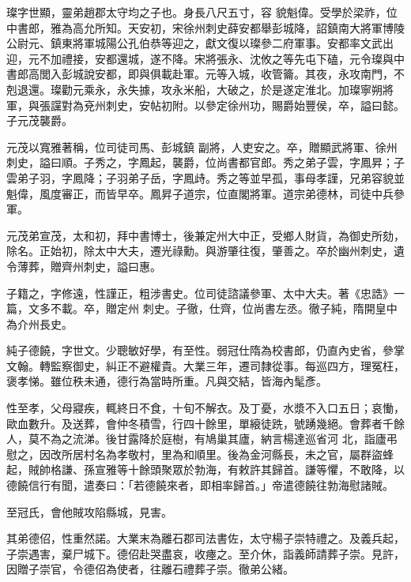 \begin{pinyinscope}
 璨字世顯，靈弟趙郡太守均之子也。身長八尺五寸，容
 貌魁偉。受學於梁祚，位中書郎，雅為高允所知。天安初，宋徐州刺史薛安都舉彭城降，詔鎮南大將軍博陵公尉元、鎮東將軍城陽公孔伯恭等迎之，獻文復以璨參二府軍事。安都率文武出迎，元不加禮接，安都還城，遂不降。宋將張永、沈攸之等先屯下磕，元令璨與中書郎高閭入彭城說安都，即與俱載赴軍。元等入城，收管籥。其夜，永攻南門，不剋退還。璨勸元乘永，永失據，攻永米船，大破之，於是遂定淮北。加璨寧朔將軍，與張讜對為兗州刺史，安帖初附。以參定徐州功，賜爵始豐侯，卒，謚曰懿。子元茂襲爵。



 元茂以寬雅著稱，位司徒司馬、彭城鎮
 副將，人吏安之。卒，贈顯武將軍、徐州刺史，謚曰順。子秀之，字鳳起，襲爵，位尚書都官郎。秀之弟子雲，字鳳昇；子雲弟子羽，字鳳降；子羽弟子岳，字鳳歭。秀之等並早孤，事母孝謹，兄弟容貌並魁偉，風度審正，而皆早卒。鳳昇子道宗，位直閣將軍。道宗弟德林，司徒中兵參軍。



 元茂弟宣茂，太和初，拜中書博士，後兼定州大中正，受鄉人財貨，為御史所劾，除名。正始初，除太中大夫，遷光祿勳。與游肇往復，肇善之。卒於幽州刺史，遺令薄葬，贈齊州刺史，謚曰惠。



 子籍之，字修遠，性謹正，粗涉書史。位司徒諮議參軍、太中大夫。著《忠誥》一篇，文多不載。卒，贈定州
 刺史。子徹，仕齊，位尚書左丞。徹子純，隋開皇中為介州長史。



 純子德饒，字世文。少聰敏好學，有至性。弱冠仕隋為校書郎，仍直內史省，參掌文翰。轉監察御史，糾正不避權貴。大業三年，遷司隸從事。每巡四方，理冤枉，褒孝悌。雖位秩未通，德行為當時所重。凡與交結，皆海內髦彥。



 性至孝，父母寢疾，輒終日不食，十旬不解衣。及丁憂，水漿不入口五日；哀慟，歐血數升。及送葬，會仲冬積雪，行四十餘里，單縗徒跣，號踴幾絕。會葬者千餘人，莫不為之流涕。後甘露降於庭樹，有鳩巢其廬，納言楊達巡省河
 北，詣廬弔慰之，因改所居村名為孝敬村，里為和順里。後為金河縣長，未之官，屬群盜蜂起，賊帥格謙、孫宣雅等十餘頭聚眾於勃海，有敕許其歸首。謙等懼，不敢降，以德饒信行有聞，遣奏曰：「若德饒來者，即相率歸首。」帝遣德饒往勃海慰諸賊。



 至冠氏，會他賊攻陷縣城，見害。



 其弟德佋，性重然諾。大業末為離石郡司法書佐，太守楊子崇特禮之。及義兵起，子崇遇害，棄尸城下。德佋赴哭盡哀，收瘞之。至介休，詣義師請葬子崇。見許，因贈子崇官，令德佋為使者，往離石禮葬子崇。徹弟公緒。




\end{pinyinscope}
